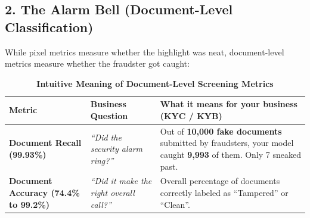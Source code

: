 \documentclass[10pt,a4paper]{article}
\begin{document}
\vspace{1em}

\subsection*{2. The Alarm Bell (Document-Level Classification)}
While pixel metrics measure whether the highlight was neat, document-level metrics measure whether the fraudster got caught:

\begin{table}[htbp]
\centering
\small
\caption{\textbf{Intuitive Meaning of Document-Level Screening Metrics}}
\label{tab:simple_doc_metrics}
\vspace{2mm}
\begin{tabularx}{\textwidth}{l p{4.2cm} X}
\toprule
\textbf{Metric} & \textbf{Business Question} & \textbf{What it means for your business (KYC / KYB)} \\
\midrule
\textbf{Document Recall (99.93\%)} & \textit{``Did the security alarm ring?''} & Out of \textbf{10,000 fake documents} submitted by fraudsters, your model caught \textbf{9,993} of them. Only 7 sneaked past. \\
\addlinespace
\textbf{Document Accuracy (74.4\% to 99.2\%)} & \textit{``Did it make the right overall call?''} & Overall percentage of documents correctly labeled as ``Tampered'' or ``Clean''. \\
\bottomrule
\end{tabularx}
\end{table}
\end{document}
